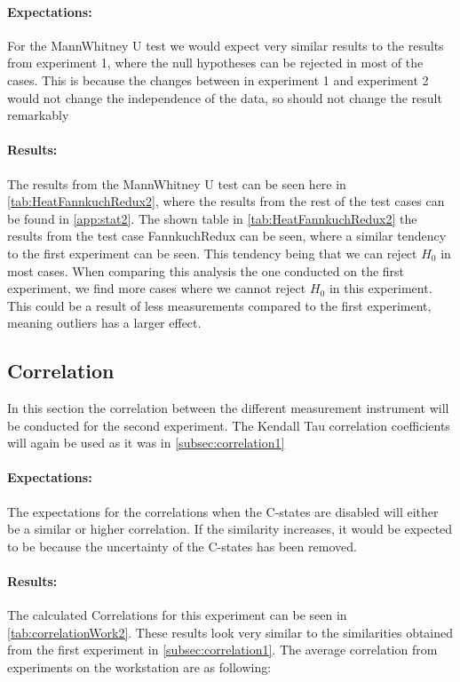 \paragraph{Expectations:} For the MannWhitney U test we would expect very similar results to the results from experiment 1, where the null hypotheses can be rejected in most of the cases. This is because the changes between in experiment 1 and experiment 2 would not change the independence of the data, so should not change the result remarkably



\paragraph{Results:} The results from the MannWhitney U test can be seen here in \cref{tab:HeatFannkuchRedux2}, where the results from the rest of the test cases can be found in \cref{app:stat2}. The shown table in \cref{tab:HeatFannkuchRedux2} the results from the test case FannkuchRedux can be seen, where a similar tendency to the first experiment can be seen. This tendency being that we can reject $H_0$ in most cases. When comparing this analysis the one conducted on the first experiment, we find more cases where we cannot reject $H_0$ in this experiment. This could be a result of less measurements compared to the first experiment, meaning outliers has a larger effect.

\subsection{Correlation}\label{subsec:correlation2}
In this section the correlation between the different measurement instrument will be conducted for the second experiment. The Kendall Tau correlation coefficients will again be used as it was in \cref{subsec:correlation1}

\paragraph{Expectations:} The expectations for the correlations when the C-states are disabled will either be a similar or higher correlation. If the similarity increases, it would be expected to be because the uncertainty of the C-states has been removed.



\paragraph{Results:} The calculated Correlations for this experiment can be seen in \cref{tab:correlationWork2}. These results look very similar to the similarities obtained from the first experiment in \cref{subsec:correlation1}. The average correlation from experiments on the workstation are as following:

